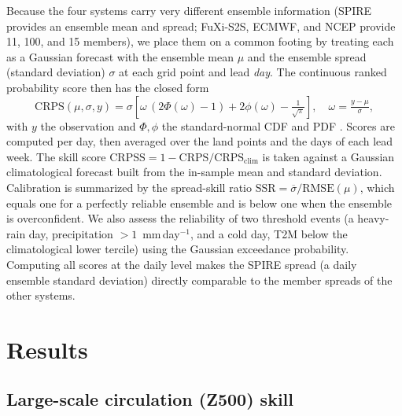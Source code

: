 \documentclass[11pt]{article}
\begin{document}
Because the four systems carry very different ensemble information
(SPIRE provides an ensemble mean and spread; FuXi-S2S, ECMWF, and NCEP
provide 11, 100, and 15 members), we place them on a common footing by
treating each as a Gaussian forecast with the ensemble mean $\mu$ and the
ensemble spread (standard deviation) $\sigma$ at each grid point and lead
\emph{day}. The continuous ranked probability score then has the
closed form
\begin{equation}
  \mathrm{CRPS}(\mu,\sigma,y) = \sigma\!\left[\omega\,(2\Phi(\omega)-1)
  + 2\phi(\omega) - \tfrac{1}{\sqrt{\pi}}\right],\quad \omega=\tfrac{y-\mu}{\sigma},
  \label{eq:crps}
\end{equation}
with $y$ the observation and $\Phi,\phi$ the standard-normal CDF and PDF
\citep{gneiting2007}. Scores are computed per day, then averaged over the
land points and the days of each lead week. The skill score
$\mathrm{CRPSS}=1-\mathrm{CRPS}/\mathrm{CRPS}_{\mathrm{clim}}$ is taken
against a Gaussian climatological forecast built from the in-sample mean
and standard deviation. Calibration is summarized by the spread-skill
ratio $\mathrm{SSR}=\overline{\sigma}/\mathrm{RMSE}(\mu)$, which equals
one for a perfectly reliable ensemble and is below one when the ensemble
is overconfident. We also assess the reliability of two threshold events
(a heavy-rain day, precipitation $>1$~mm\,day$^{-1}$, and a cold day, T2M
below the climatological lower tercile) using the Gaussian exceedance
probability. Computing all scores at the daily level makes the SPIRE
spread (a daily ensemble standard deviation) directly comparable to the
member spreads of the other systems.

\section{Results}\label{sec:results}

\subsection{Large-scale circulation (Z500) skill}\label{sec:lead_skill}
\end{document}
